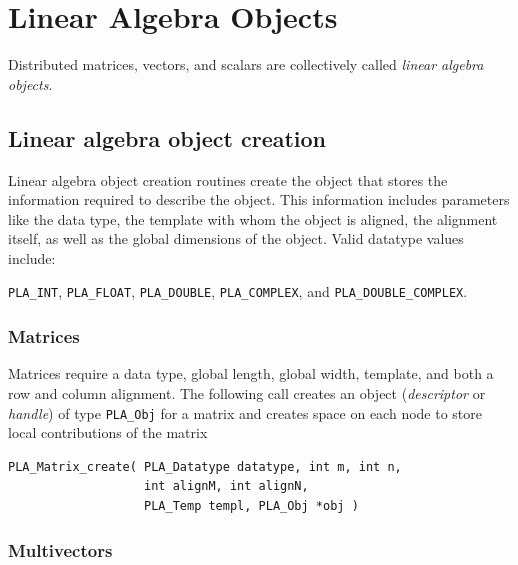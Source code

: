 \section{Linear Algebra Objects}

Distributed matrices, vectors, and scalars are collectively called 
{\em linear algebra objects}.


\subsection{Linear algebra object creation}

Linear algebra object creation routines create the object that stores the information
required to describe the object.  This information includes parameters like the data type,
the template with whom the object is aligned, the alignment itself, as well as the
global dimensions of the object.  Valid datatype values include:
\begin{center}
{\tt PLA\_INT}, {\tt PLA\_FLOAT}, {\tt PLA\_DOUBLE}, {\tt PLA\_COMPLEX}, and {\tt PLA\_DOUBLE\_COMPLEX}.
\end{center}


\subsubsection{Matrices}

Matrices require a data type, global length, global width,
template, and both a row and column alignment.
The following call creates an object ({\em descriptor} or {\em handle}) 
of type {\tt PLA\_Obj} for a matrix and creates space on each node to store
local contributions of the matrix
\begin{FlaSpec}
\begin{verbatim} 
PLA_Matrix_create( PLA_Datatype datatype, int m, int n, 
                   int alignM, int alignN, 
                   PLA_Temp templ, PLA_Obj *obj )
\end{verbatim}
\end{FlaSpec}

\subsubsection{Multivectors}

